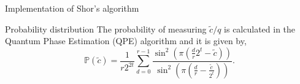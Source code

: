 \begin{frame}{Implementation of Shor's algorithm}










    




\begin{block}{Probability distribution}
The probability of measuring $\tilde{c}/q$ is calculated in the Quantum Phase Estimation (QPE) algorithm and it is given by,
\[
\mathbb{P}(\tilde{c})=\frac{1}{r2^{2t}}\sum_{d=0}^{r-1} \frac{\sin^2\left(\pi \left( \frac{d}{r}2^t -  \tilde{c} \right) \right)}{\sin^2\left(\pi \left( \frac{d}{r} -  \frac{\tilde{c}}{2^t} \right) \right)}.
\]
\end{block}

\end{frame}